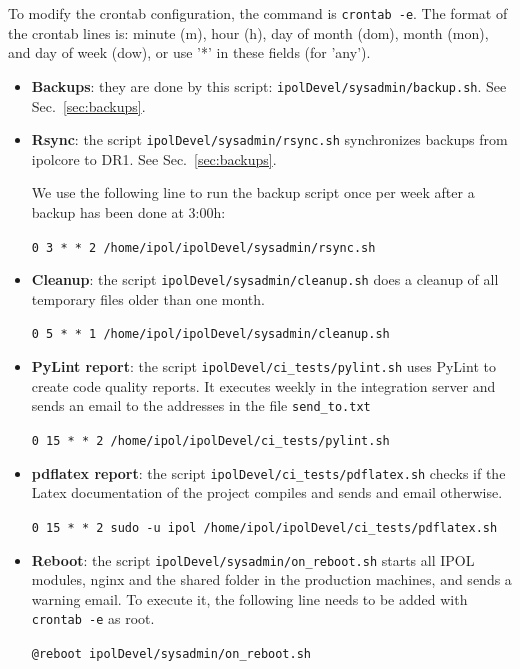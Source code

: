 \documentclass[a4paper,12pt]{article}
\begin{document}
To modify the crontab configuration, the command is {\tt crontab -e}. The format of the crontab lines is: minute (m), hour (h), day of month (dom), month (mon), and day of week (dow), or use '*' in these fields (for 'any').

\begin{itemize}
    \item \textbf{Backups}: they are done by this script: {\tt ipolDevel/sysadmin/backup.sh}. See Sec.~\ref{sec:backups}.
    
    \item \textbf{Rsync}: the script {\tt ipolDevel/sysadmin/rsync.sh} synchronizes backups from ipolcore to DR1. See Sec.~\ref{sec:backups}.

We use the following line to run the backup script once per week after a backup has been done at 3:00h:

    {\tt 0 3 * * 2 /home/ipol/ipolDevel/sysadmin/rsync.sh}
    
    \item \textbf{Cleanup}: the script {\tt ipolDevel/sysadmin/cleanup.sh} does a cleanup of all temporary files older than one month.

    {\tt 0 5 * * 1 /home/ipol/ipolDevel/sysadmin/cleanup.sh}

    \item \textbf{PyLint report}: the script {\tt ipolDevel/ci\_tests/pylint.sh} uses PyLint to create code quality reports. It executes weekly in the integration server and sends an email to the addresses in the file {\tt send\_to.txt}

    {\tt 0 15 * * 2 /home/ipol/ipolDevel/ci\_tests/pylint.sh}

    \item \textbf{pdflatex report}: the script {\tt ipolDevel/ci\_tests/pdflatex.sh} checks if the Latex documentation of the project compiles and sends and email otherwise.

    {\tt 0 15 * * 2 sudo -u ipol /home/ipol/ipolDevel/ci\_tests/pdflatex.sh}

    \item \textbf{Reboot}: the script {\tt ipolDevel/sysadmin/on\_reboot.sh} starts all IPOL modules, nginx and the shared folder in the production machines, and sends a warning email. To execute it, the following line needs to be added with {\tt crontab -e} as root.

    {\tt @reboot ipolDevel/sysadmin/on\_reboot.sh}
\end{itemize}
\end{document}
